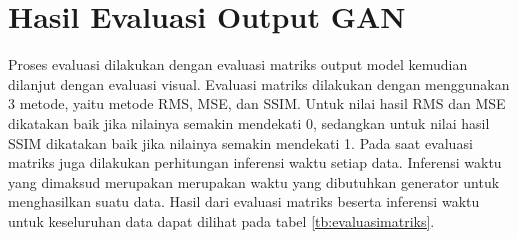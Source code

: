 \section{Hasil Evaluasi Output GAN}
\label{sec:evaluasiOutput}

Proses evaluasi dilakukan dengan evaluasi matriks output model kemudian dilanjut dengan evaluasi visual. 
Evaluasi matriks dilakukan dengan menggunakan 3 metode, yaitu metode RMS, MSE, dan SSIM. 
Untuk nilai hasil RMS dan MSE dikatakan baik jika nilainya semakin mendekati 0, sedangkan untuk nilai hasil SSIM dikatakan baik jika nilainya semakin mendekati 1. 
Pada saat evaluasi matriks juga dilakukan perhitungan inferensi waktu setiap data.
Inferensi waktu yang dimaksud merupakan merupakan waktu yang dibutuhkan generator untuk menghasilkan suatu data.
Hasil dari evaluasi matriks beserta inferensi waktu untuk keseluruhan data dapat dilihat pada tabel \ref{tb:evaluasimatriks}. 

